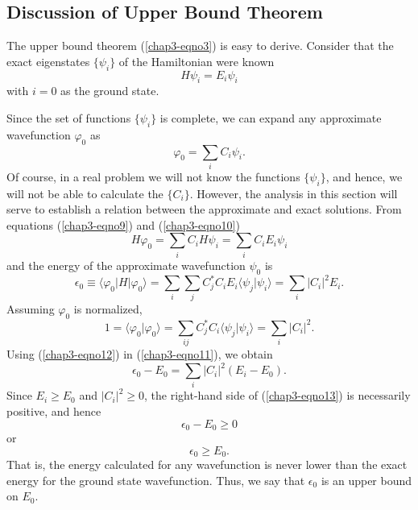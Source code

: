 \subsection{Discussion of Upper Bound Theorem}

The upper bound theorem (\ref{chap3-eqno3}) is easy to
derive. Consider that the exact eigenstates $\{ \psi_i \}$ of the
Hamiltonian were known
\begin{equation}
H \psi_i = E_i \psi_i
\label{chap3-eqno9}
\end{equation}
with $i = 0$ as the ground state.

Since the set of functions $\{ \psi_i \}$ is complete, we can expand any 
approximate wavefunction $\varphi_0$ as
\begin{equation}
\varphi_0 = \sum_{i} C_i \psi_i .
\label{chap3-eqno10}
\end{equation}
Of course, in a real problem we will not know the functions $\{ \psi_i
\}$, and hence, we will not be able to calculate the $\{ C_i \}$.
However, the analysis in this section will serve to establish a
relation between the approximate and exact solutions. From equations
(\ref{chap3-eqno9}) and (\ref{chap3-eqno10})
\begin{equation}
H \varphi_0 = \sum_i C_i H \psi_i = \sum_i C_i E_i 
\psi_i
\end{equation}
and the energy of the approximate wavefunction $\psi_0$ is
\begin{equation}
\epsilon_0 \equiv \langle \varphi_0 \vert H \vert \varphi_0 
\rangle = \sum_i \sum_j C^*_j C_i E_i \langle \psi_j \vert \psi_i 
\rangle = \sum_i \vert C_i \vert^2 E_i .
\label{chap3-eqno11}
\end{equation}
Assuming $\varphi_0$ is normalized,
\begin{equation}
1 = \langle \varphi_0 \vert \varphi_0 \rangle = \sum_{ij} C^*_j C_i \langle 
\psi_j \vert \psi_i \rangle = \sum_i \vert C_i \vert^2 .
\label{chap3-eqno12}
\end{equation}
Using (\ref{chap3-eqno12}) in (\ref{chap3-eqno11}), we obtain
\begin{equation}
\epsilon_0 - E_0 = \sum_i \vert C_i \vert^2 \left( E_i - E_0 \right) 
.
\label{chap3-eqno13}
\end{equation}
Since $E_i \geq E_0$ and $\vert C_i \vert^2 \geq 0$, the right-hand side 
of (\ref{chap3-eqno13}) is necessarily positive, and hence
\begin{equation}
\epsilon_0 - E_0 \geq 0
\end{equation}
or
\begin{equation}
\epsilon_0 \geq E_0 .
\label{chap3-eqno14}
\end{equation}
That is, the energy calculated for any wavefunction is never lower than the
exact energy for the ground state wavefunction. Thus, we say that 
$\epsilon_0$ is an upper bound on $E_0$.

